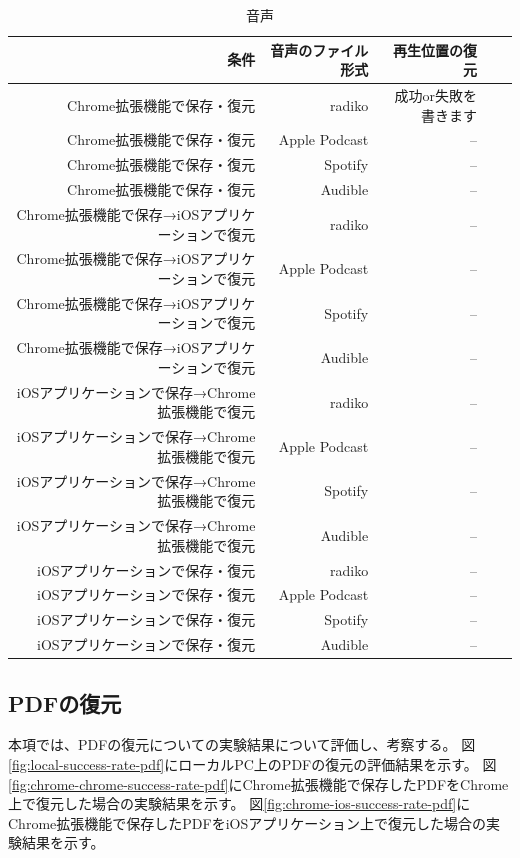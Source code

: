\begin{table}[htbp]
  \caption{音声}
  \label{tb:evl-result-audio}
  \begin{center}
    \begin{tabular}{rrrrr}
      \hline
      条件 & 音声のファイル形式 & 再生位置の復元 \\ \hline \hline
      Chrome拡張機能で保存・復元 & radiko & 成功or失敗を書きます  \\ \hline
      Chrome拡張機能で保存・復元 & Apple Podcast & --  \\ \hline
      Chrome拡張機能で保存・復元 & Spotify & --  \\ \hline
      Chrome拡張機能で保存・復元 & Audible & --  \\ \hline
      Chrome拡張機能で保存→iOSアプリケーションで復元 & radiko & --  \\ \hline
      Chrome拡張機能で保存→iOSアプリケーションで復元 & Apple Podcast & --  \\ \hline
      Chrome拡張機能で保存→iOSアプリケーションで復元 & Spotify & --  \\ \hline
      Chrome拡張機能で保存→iOSアプリケーションで復元 & Audible & --  \\ \hline
      iOSアプリケーションで保存→Chrome拡張機能で復元 & radiko & --  \\ \hline
      iOSアプリケーションで保存→Chrome拡張機能で復元 & Apple Podcast & --  \\ \hline
      iOSアプリケーションで保存→Chrome拡張機能で復元 & Spotify & --  \\ \hline
      iOSアプリケーションで保存→Chrome拡張機能で復元 & Audible & --  \\ \hline
      iOSアプリケーションで保存・復元 & radiko & --  \\ \hline
      iOSアプリケーションで保存・復元 & Apple Podcast & --  \\ \hline
      iOSアプリケーションで保存・復元 & Spotify & --  \\ \hline
      iOSアプリケーションで保存・復元 & Audible & --  \\ \hline
    \end{tabular}
  \end{center}
\end{table}

\subsection{PDFの復元}
本項では、PDFの復元についての実験結果について評価し、考察する。
図\ref{fig:local-success-rate-pdf}にローカルPC上のPDFの復元の評価結果を示す。
図\ref{fig:chrome-chrome-success-rate-pdf}にChrome拡張機能で保存したPDFをChrome上で復元した場合の実験結果を示す。
図\ref{fig:chrome-ios-success-rate-pdf}にChrome拡張機能で保存したPDFをiOSアプリケーション上で復元した場合の実験結果を示す。

